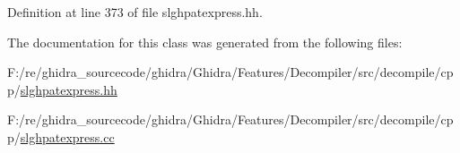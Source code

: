 Definition at line 373 of file slghpatexpress.\+hh.



The documentation for this class was generated from the following files\+:\begin{DoxyCompactItemize}
\item 
F\+:/re/ghidra\+\_\+sourcecode/ghidra/\+Ghidra/\+Features/\+Decompiler/src/decompile/cpp/\mbox{\hyperlink{slghpatexpress_8hh}{slghpatexpress.\+hh}}\item 
F\+:/re/ghidra\+\_\+sourcecode/ghidra/\+Ghidra/\+Features/\+Decompiler/src/decompile/cpp/\mbox{\hyperlink{slghpatexpress_8cc}{slghpatexpress.\+cc}}\end{DoxyCompactItemize}
